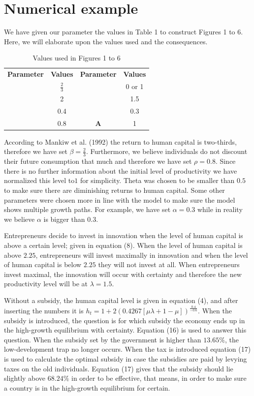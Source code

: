 \documentclass[a4paper,11pt]{article} %
\begin{document}
\section{Numerical example}
We have given our parameter the values in Table 1 to construct Figures 1 to 6. Here, we will elaborate upon the values  used and the consequences. 

\begin{table}[h]
\centering
\caption{Values used in Figures 1 to 6}
\begin{tabular}{c c c c}
  \toprule[1.5pt]
  \textbf{Parameter} & \textbf{Values} &  \textbf{Parameter} & \textbf{Values}\\
  \cmidrule(r){1-2}\cmidrule(l){3-4}
  \pmb{\(\beta\)} & \(\frac{2}{3}\) & \pmb{\(\mu\)} & 0 or 1 \\
  \pmb{\(\gamma\)} & 2 & \pmb{\(\lambda\)} & 1.5 \\
  \pmb{\(\theta\)} & 0.4 & \pmb{\(\alpha\)} & 0.3 \\
  \pmb{\(\rho\)} & 0.8 & \textbf{A} & 1 \\
  \bottomrule[1.5pt]
\end{tabular}
\end{table}

According to Mankiw et al. (1992) the return to human capital is two-thirds, therefore we have set \(\beta=\frac{2}{3}\). Furthermore, we believe individuals do not  discount their future consumption that much and therefore we have set \(\rho=0.8\). Since there is no further information about the initial level of productivity we have normalized this level to\(1\) for simplicity. Theta was chosen to be smaller than \(0.5\) to make sure there are diminishing returns to human capital. Some other parameters were chosen more in line with the model to make sure the model shows multiple growth paths. For example, we have set \(\alpha=0.3\) while in reality we believe \(\alpha\) is bigger than \(0.3\).

Entrepreneurs decide to invest in innovation when the level of human capital is above a certain level; given in equation (8). When the level of human capital is above \(2.25\), entrepreneurs will invest maximally in innovation and when the level of human capital is below \(2.25\) they will not invest at all. When entrepreneurs invest maximal, the innovation will occur with certainty and therefore the new productivity level will be at \(\lambda=1.5\).

Without a subsidy, the human capital level is given in equation (4), and after inserting the numbers it is \(h_t=1+2\left(0.4267\left[\mu\lambda+1-\mu\right]\right)^{\frac{0.4}{-0.6}}\). When the subsidy is introduced, the question is for which subsidy the economy ends up in the high-growth equilibrium with certainty. Equation (16) is used to answer this question. When the subsidy set by the government is higher than \(13.65\%\), the low-development trap no longer occurs. When the tax is introduced equation (17) is used to calculate the optimal subsidy in case the subsidies are paid by levying taxes on the old individuals. Equation (17) gives that the subsidy should lie slightly above \(68.24\%\) in order to be effective, that means, in order to make sure a country is in the high-growth equilibrium for certain.

 
\end{document}
